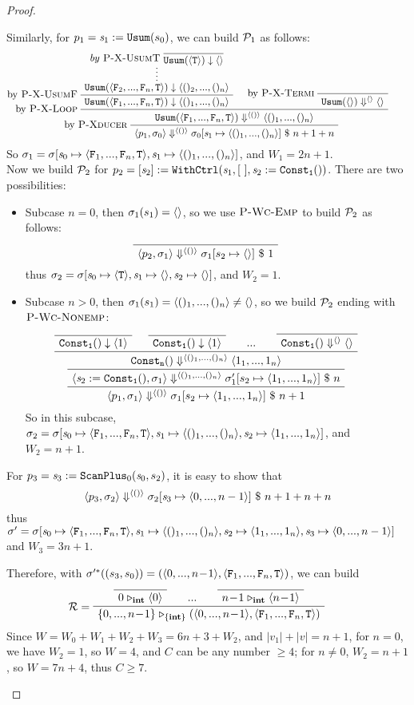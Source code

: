 \begin{proof}
\begin{itemize}
	 Similarly, for $p_1 = \sdef{\s_1}{\usum(s_0)}$, we can build $\MP_1$ as follows:
	 $$\PT{
	 	\AC{ \infer*{\blockf{\usum}{\<\F_2,...,\F_n,\T\'>}{\< ()_2,...,()_n\'>}} 
	 		{by \ \PName{X-UsumT} \  \vcenter{\infer {\blockf{\usum}{\singl{\T}}{\emptyv}}{}}}
	 	}
	 	\LeftLabel{by \PName{X-UsumF}}
	 	\UC{\blockf{\usum}{\flagn}{\nunit}}
	 	\AC{}
	 	\LeftLabel{by \PName{X-Termi}}
	 	\UC{\sevalfg{\usum}{\emptyv}{\emptyv} \emptyv}
	 	\LeftLabel{by \PName{X-Loop}}
	 	\BC{\sevalfg{\usum}{\flagn}{\vunit}{\nunit}}
	 	\LeftLabel{by \PName{Xducer}}
	 	\UC{\seval{p_1}{\sgm_0}{\vunit}{\sgm_0[\s_1 \|-> \nunit]}{n+1+n}}
	 }$$
	 So $\sgm_1 = \sgm[\s_0 \|-> \flagn, \s_1 \|-> \nunit]$, and $W_1 = 2n+1$. \\
	 
	 Now we build $\MP_2$ for $p_2 = \withctrl{\s_1}{\sdef{\s_2}{\consta{1}()}}{[ \ ]}{[\s_2]}$. There are two possibilities: 
	 
	 \begin{itemize}
	 	\item Subcase $n=0$, then $\sgm_1(s_1) = \emptyv$, so we use $\PName{Wc-Emp}$ to build $\MP_2$ as follows:	 	
	 	$$\PT{\Axiom{\seval{p_2}{\sgm_1}{\vunit}{\sgm_1[s_2 \|-> \emptyv]}{1}}}$$
	 	thus $\sgm_2 = \sgm[\s_0 \|-> \oT, \s_1 \|-> \emptyv, \s_2 \|-> \emptyv]$, and $W_2 = 1$. 
	 	
		\item Subcase $n >0$, then $\sgm_1(s_1) = \nunit \neq \emptyv$, so we build $\MP_2$ ending with $\PName{Wc-Nonemp}$:
		$$\PT{
			\Axiom{\blockf{\consta{1}}{}{\singl{1}}}
			\Axiom{\blockf{\consta{1}}{}{\singl{1}}}
			\AC{...}
			\Axiom{\sevalfg{\consta{1}}{}{\emptyv}{\emptyv}}
			\QuaternaryInfC{$\sevalfg{\consta{n}}{}{\nunit}{\<1_1,...,1_n\'>}$}
			\UC{\seval{\sdef{\s_2}{\consta{1}()}}{\sgm_1}{\nunit}
				{\sgm'_1[s_2 \|-> \<1_1,...,1_n\'>]}{n}}
			\UC{\seval{p_1}{\sgm_1}{\vunit}{\sgm_1[s_2 \|-> \<1_1,...,1_n\'>]}{n+1}}}$$
	 	So in this subcase, $\sgm_2 = \sgm[\s_0 \|-> \flagn, \s_1 \|-> \nunit, \s_2 \|-> \<1_1,...,1_n\'>]$, and $W_2 = n+1$.
	 \end{itemize}

	 For $p_3 = \sdef{\s_3}{\scan_{0}(\s_0,s_2)}$, it is easy to show that 
	 $$\seval{p_3}{\sgm_2}{\vunit}{\sgm_2[\s_3 \|-> \<0,...,n-1\'>]}{n+1+n+n}$$ 
	 thus $\sgm' = \sgm[\s_0 \|-> \flagn, \s_1 \|-> \nunit, \s_2 \|-> \<1_1,...,1_n\'>, \s_3 \|-> \<0,...,n-1\'>]$ 
	 and $W_3= 3n+1$. 
	 
	 Therefore, with $\sgm'^*((s_3,s_0)) = (\<0,...,n\!-\!1\'>,\flagn)$, we can build 
	 $$\PT{
	 	\Axiom{\ValRep{0}{\int}{\singl{0}}}
	 	\AC{...}
	 	\Axiom{\ValRep{n\!-\!1}{\int}{\singl{n\!-\!1}}}
	 	\LeLa{\MR =}
	 	\TC{\ValRep{\{0,...,n\!-\!1\}}{\tseq{\int}}{(\<0,...,n\!-\!1\'>,\flagn)}}
	 }$$
	 Since $W = W_0+W_1+W_2+W_3 = 6n+3 + W_2$, and $|v_1|+|v| = n+1$,
     for $n=0$, we have $W_2=1$, so $W = 4 $, and  $C$ can be any number $\ge 4$;
     for $n \neq 0$, $W_2 = n+1$, so $W= 7n+4$, thus $C \ge 7$.
	 	
	
\end{itemize}
\end{proof}

